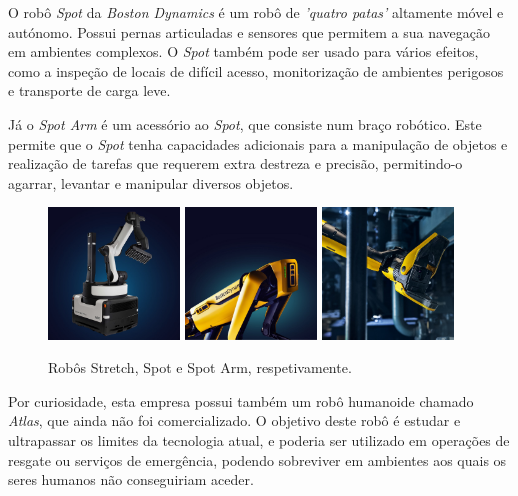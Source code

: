 \documentclass[10pt]{article}
\begin{document}
O robô \emph{Spot}\cite{spot} da \textit{Boston Dynamics} é um robô de \textit{'quatro patas'} altamente móvel e autónomo. Possui pernas articuladas e sensores que permitem a sua navegação em ambientes complexos. O \emph{Spot} também pode ser usado para vários efeitos, como a inspeção de locais de difícil acesso, monitorização de ambientes perigosos e transporte de carga leve. 

Já o \emph{Spot Arm}\cite{spot-arm} é um acessório ao \emph{Spot}, que consiste num braço robótico. Este permite que o \emph{Spot} tenha capacidades adicionais para a manipulação de objetos e realização de tarefas que requerem extra destreza e precisão, permitindo-o agarrar, levantar e manipular diversos objetos.

\begin{figure}[!h]
\centering
\includegraphics[width = 3.5cm]{img/stretch.jpg}
\includegraphics[width = 3.5cm]{img/spot.jpg}
\includegraphics[width = 3.5cm]{img/spot-arm.jpg}
\label{figura:4}
\caption{Robôs Stretch, Spot e Spot Arm, respetivamente.}
\end{figure}

Por curiosidade, esta empresa possui também um robô humanoide chamado \emph{Atlas}, que ainda não foi comercializado. O objetivo deste robô é estudar e ultrapassar os limites da tecnologia atual, e poderia ser utilizado em operações de resgate ou serviços de emergência, podendo sobreviver em ambientes aos quais os seres humanos não conseguiriam aceder.
\end{document}
